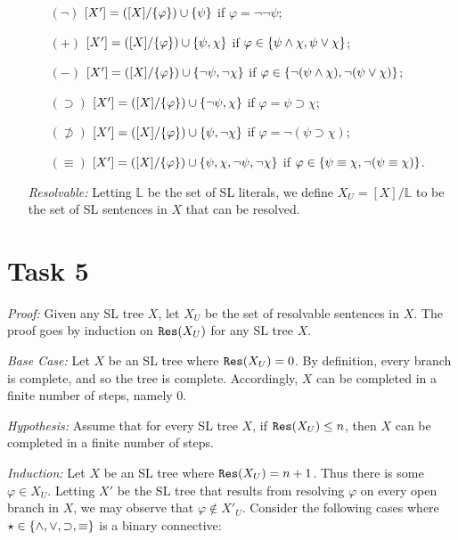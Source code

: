 \documentclass[a4paper, 11pt]{article} %
\begin{document}
\begin{itemize}
        \begin{itemize}
          \item[$(\neg)$] $[X']=([X]/\lbrace\varphi\rbrace)\cup\lbrace\psi\rbrace$ if $\varphi=\neg\neg\psi$;
          \item[$(+)$] $[X']=([X]/\lbrace\varphi\rbrace)\cup\lbrace\psi,\chi\rbrace$ if $\varphi\in\lbrace\psi\wedge\chi,\psi\vee\chi\rbrace$;  
          \item[$(-)$] $[X']=([X]/\lbrace\varphi\rbrace)\cup\lbrace\neg\psi,\neg\chi\rbrace$ if $\varphi\in\lbrace\neg(\psi\wedge\chi),\neg(\psi\vee\chi)\rbrace$;
          \item[$(\supset)$] $[X']=([X]/\lbrace\varphi\rbrace)\cup\lbrace\neg\psi,\chi\rbrace$ if $\varphi=\psi\supset\chi$; 
          \item[$(\not\supset)$] $[X']=([X]/\lbrace\varphi\rbrace)\cup\lbrace\psi,\neg\chi\rbrace$ if $\varphi=\neg(\psi\supset\chi)$; 
          \item[$(\equiv)$] $[X']=([X]/\lbrace\varphi\rbrace)\cup\lbrace\psi,\chi, \neg\psi,\neg\chi\rbrace$ if $\varphi\in\lbrace\psi\equiv\chi,\neg(\psi\equiv\chi)\rbrace$.
        \end{itemize}
  \item[\it Resolvable:] Letting $\mathbb{L}$ be the set of SL literals, we define $X_U=[X]/\mathbb{L}$ to be the set of SL sentences in $X$ that can be resolved. 
\end{itemize}


\section*{Task 5}

\textit{Proof:}
Given any SL tree $X$, let $X_U$ be the set of resolvable sentences in $X$.
The proof goes by induction on $\texttt{Res}(X_U)$ for any SL tree $X$. 

\textit{Base Case:}
Let $X$ be an SL tree where $\texttt{Res}(X_U)=0$.
By definition, every branch is complete, and so the tree is complete.
Accordingly, $X$ can be completed in a finite number of steps, namely $0$. 

\textit{Hypothesis:}
Assume that for every SL tree $X$, if $\texttt{Res}(X_U)\leq n$, then $X$ can be completed in a finite number of steps. 

\textit{Induction:}
Let $X$ be an SL tree where $\texttt{Res}(X_U)=n+1$.
Thus there is some $\varphi \in X_U$.
Letting $X'$ be the SL tree that results from resolving $\varphi$ on every open branch in $X$, we may observe that $\varphi \notin X'_U$.
Consider the following cases where $\star\in\lbrace\wedge,\vee,\supset,\equiv\rbrace$ is a binary connective:
\end{document}
